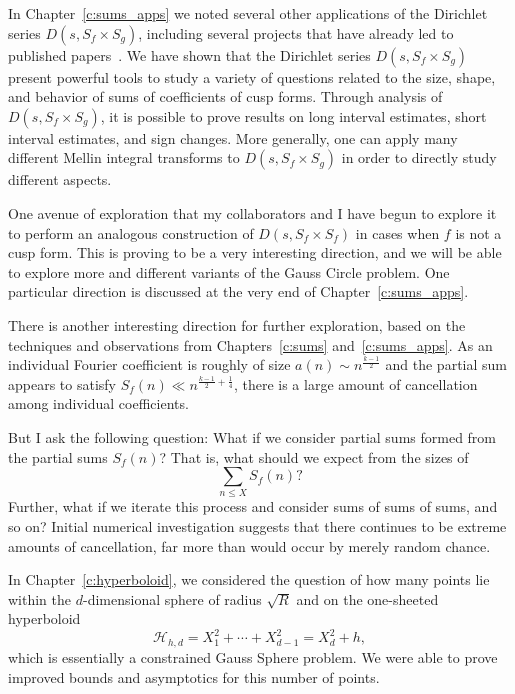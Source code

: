 In Chapter~\ref{c:sums_apps} we noted several other applications of the Dirichlet series
$D(s, S_f \times S_g)$, including several projects that have already led to published
papers~\cite{hkldw, hkldwShort, hkldwSigns}.
We have shown that the Dirichlet series $D(s, S_f \times S_g)$ present powerful tools to
study a variety of questions related to the size, shape, and behavior of sums of
coefficients of cusp forms.
Through analysis of $D(s, S_f \times S_g)$, it is possible to prove results on long
interval estimates, short interval estimates, and sign changes.
More generally, one can apply many different Mellin integral transforms to $D(s, S_f
\times S_g)$ in order to directly study different aspects.


One avenue of exploration that my collaborators and I have begun to explore it to perform
an analogous construction of $D(s, S_f \times S_f)$ in cases when $f$ is not a cusp form.
This is proving to be a very interesting direction, and we will be able to explore more
and different variants of the Gauss Circle problem.
One particular direction is discussed at the very end of Chapter~\ref{c:sums_apps}.


There is another interesting direction for further exploration, based on the techniques
and observations from Chapters~\ref{c:sums} and~\ref{c:sums_apps}.
As an individual Fourier coefficient is roughly of size $a(n) \sim n^{\frac{k-1}{2}}$ and
the partial sum appears to satisfy $S_f(n) \ll n^{\frac{k-1}{2} + \frac{1}{4}}$, there is
a large amount of cancellation among individual coefficients.


But I ask the following question: What if we consider partial sums formed from the partial
sums $S_f(n)$?
That is, what should we expect from the sizes of
\begin{equation}
  \sum_{n \leq X} S_f(n)?
\end{equation}
Further, what if we iterate this process and consider sums of sums of sums, and so on?
Initial numerical investigation suggests that there continues to be extreme amounts of
cancellation, far more than would occur by merely random chance.


In Chapter~\ref{c:hyperboloid}, we considered the question of how many points lie within
the $d$-dimensional sphere of radius $\sqrt R$ and on the one-sheeted hyperboloid
\begin{equation}
  \mathcal{H}_{h,d} = X_1^2 + \cdots + X_{d-1}^2 = X_d^2 + h,
\end{equation}
which is essentially a constrained Gauss Sphere problem.
We were able to prove improved bounds and asymptotics for this number of points.


